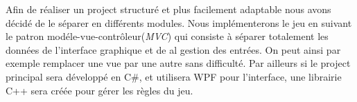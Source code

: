 Afin de réaliser un project structuré et plus facilement adaptable nous avons décidé de le séparer en différents modules. Nous implémenterons le jeu en suivant le patron modéle-vue-contrôleur(\emph{MVC}) qui consiste à séparer totalement les données de l'interface graphique et de al gestion des entrées. On peut ainsi par exemple remplacer une vue par une autre sans difficulté. Par ailleurs si le project principal sera développé en C\#, et utilisera WPF pour l'interface, une librairie C++ sera créée pour gérer les règles du jeu.